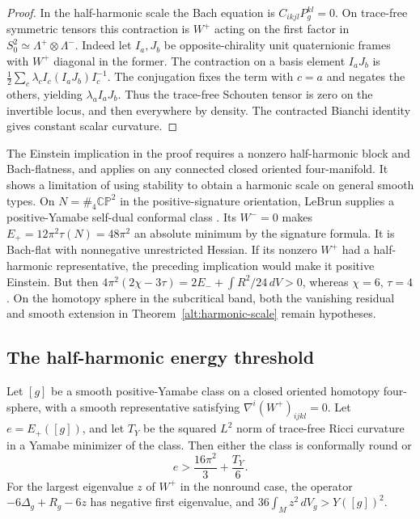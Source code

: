 \begin{proof}
In the half-harmonic scale the Bach equation is
\(C_{ikjl}P_g^{kl}=0\). On trace-free symmetric tensors this
contraction is \(W^+\) acting on the first factor in
\(S^2_0\simeq\Lambda^+\otimes\Lambda^-\).
Indeed let \(I_a,J_b\) be opposite-chirality unit quaternionic
frames with \(W^+\) diagonal in the former. The contraction on
a basis element \(I_aJ_b\) is
\(\frac12\sum_c\lambda_c I_c(I_aJ_b)I_c^{-1}\).
The conjugation fixes the term with \(c=a\) and negates the
others, yielding \(\lambda_a I_aJ_b\). Thus the trace-free
Schouten tensor is zero on the invertible locus, and then
everywhere by density. The contracted Bianchi identity gives
constant scalar curvature.
\end{proof}

The Einstein implication in the proof requires a nonzero
half-harmonic block and Bach-flatness, and applies on any connected
closed oriented four-manifold. It shows a limitation of using
stability to obtain a harmonic scale on general smooth types.
On \(N=\#_4\mathbb{CP}^2\) in the positive-signature orientation,
LeBrun supplies a positive-Yamabe self-dual conformal class
\cite[Theorem 1 and \S5, p.~235]{LeBrun1991Explicit}.
Its \(W^-=0\) makes \(E_+=12\pi^2\tau(N)=48\pi^2\)
an absolute minimum by the signature formula. It is Bach-flat
with nonnegative unrestricted Hessian. If its nonzero \(W^+\)
had a half-harmonic representative, the preceding implication
would make it positive Einstein. But then
\(4\pi^2(2\chi-3\tau)=2E_-+\int R^2/24\,dV>0\),
whereas \(\chi=6\), \(\tau=4\). On the homotopy sphere in the
subcritical band, both the vanishing residual and smooth extension
in Theorem~\ref{alt:harmonic-scale} remain hypotheses.

\subsection{The half-harmonic energy threshold}

\begin{theorem}\label{alt:harmonic-gap}
Let \([g]\) be a smooth positive-Yamabe class on a closed
oriented homotopy four-sphere, with a smooth representative
satisfying \(\nabla^i(W^+)_{ijkl}=0\). Let \(e=E_+([g])\),
and let \(T_Y\) be the squared \(L^2\) norm of trace-free
Ricci curvature in a Yamabe minimizer of the class.
Then either the class is conformally round or
\[
 e>\frac{16\pi^2}{3}+\frac{T_Y}{6}.
\]
For the largest eigenvalue \(z\) of \(W^+\) in the nonround
case, the operator \(-6\Delta_g+R_g-6z\) has negative first
eigenvalue, and \(36\int_M z^2\,dV_g>Y([g])^2\).
\end{theorem}

